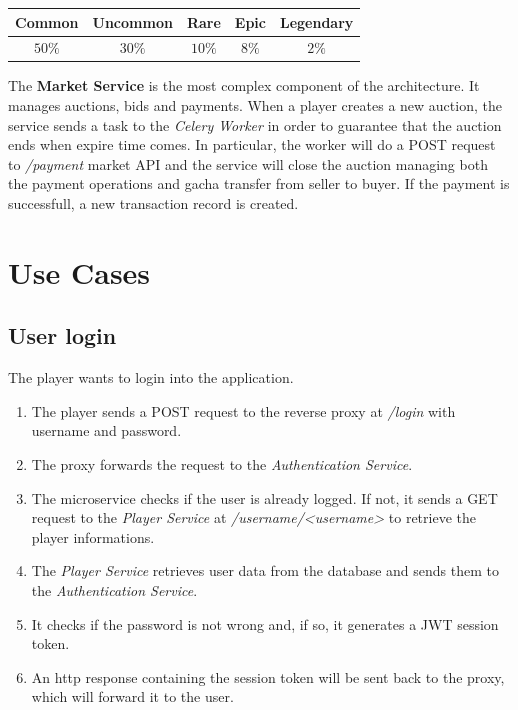 \documentclass{article}
\begin{document}
\begin{table}[ht!]
    \centering
    \begin{tabular}{|c|c|c|c|c|}
        \hline
        \textbf{Common} & \textbf{Uncommon} & \textbf{Rare} & \textbf{Epic} & \textbf{Legendary} \\
        \hline
        $50\%$          & $30\%$            & $10\%$        & $8\%$         & $2\%$              \\
        \hline
    \end{tabular}
\end{table}


The \textbf{Market Service} is the most complex component of the architecture. It manages auctions, bids and payments. When a player creates a new auction, the service sends a task to the \emph{Celery Worker} in order to guarantee that the auction ends when expire time comes. In particular, the worker will do a POST request to \emph{/payment} market API and the service will close the auction managing both the payment operations and gacha transfer from seller to buyer. If the payment is successfull, a new transaction record is created.

\section{Use Cases}
\subsection{User login}
The player wants to login into the application.
\begin{enumerate}
    \item The player sends a POST request to the reverse proxy at \emph{/login} with username and password.
    \item The proxy forwards the request to the \emph{Authentication Service}.
    \item The microservice checks if the user is already logged. If not, it sends a GET request to the \emph{Player Service} at \emph{/username/<username>} to retrieve the player informations.
    \item The \emph{Player Service} retrieves user data from the database and sends them to the \emph{Authentication Service}.
    \item It checks if the password is not wrong and, if so, it generates a JWT session token.
    \item An http response containing the session token will be sent back to the proxy, which will forward it to the user.
\end{enumerate}
\end{document}
